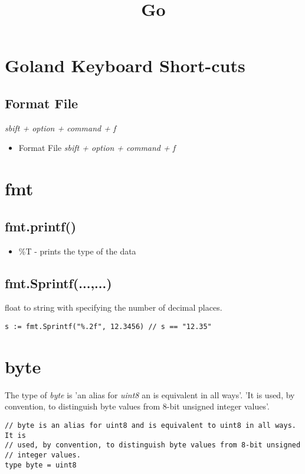 \documentclass[]{article}
\title{Go}
\author{}
\renewcommand{\it}[1]{\textit{#1}}
\begin{document}
\maketitle

\begin{abstract}

\end{abstract}

\section{Goland Keyboard Short-cuts}
\subsection{Format File}
\it{sbift + option + command + f}
\begin{itemize}
	\item Format File
	\subitem \it{sbift + option + command + f}
\end{itemize}

\section{fmt}
\subsection{fmt.printf()}
\begin{itemize}
	\item \%T - prints the type of the data 
\end{itemize}

\subsection{fmt.Sprintf(...,...)}
float to string with specifying the number of decimal places.
\begin{lstlisting}
s := fmt.Sprintf("%.2f", 12.3456) // s == "12.35"
\end{lstlisting}


\section{byte}
The type of \it{byte} is 'an alias for \it{uint8} an is equivalent in all ways'. 'It is used, by convention, to distinguish byte values from 8-bit unsigned integer values'.
\begin{lstlisting}
// byte is an alias for uint8 and is equivalent to uint8 in all ways. It is
// used, by convention, to distinguish byte values from 8-bit unsigned
// integer values.
type byte = uint8
\end{lstlisting}\cite{byte-definition}
\end{document}
